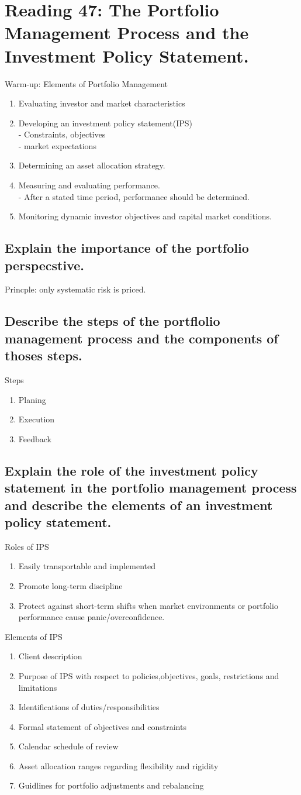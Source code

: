 \documentclass{article}
\newcommand{\be}{\begin{enumerate}}
\newcommand{\ee}{\end{enumerate}}
\begin{document}
\section{Reading 47: The Portfolio Management Process and the Investment Policy Statement.}
Warm-up: Elements of Portfolio Management
\be
    \item Evaluating investor and market characteristics
    \item Developing an investment policy statement(IPS)
        \\ - Constraints, objectives
        \\ - market expectations
    \item Determining an asset allocation strategy.
    \item Measuring and evaluating performance.
        \\ - After a stated time period, performance should be determined.
    \item Monitoring dynamic investor objectives and capital market conditions.
\ee
\subsection{Explain the importance of the portfolio perspecstive.}
Princple: only systematic risk is priced.
\subsection{Describe the steps of the portflolio management process and the components
of thoses steps.}
Steps
\be
    \item Planing
    \item Execution
    \item Feedback
\ee
\subsection{Explain the role of the investment policy statement in the portfolio
management process and describe the elements of an investment policy statement.}
Roles of IPS
\be
    \item Easily transportable and implemented
    \item Promote long-term discipline
    \item Protect against short-term shifts when market environments or portfolio performance
    cause panic/overconfidence.
\ee 
Elements of IPS
\be
    \item Client description
    \item Purpose of IPS with respect to policies,objectives, goals, restrictions and limitations
    \item Identifications of duties/responsibilities
    \item Formal statement of objectives and constraints
    \item Calendar schedule of review
    \item Asset allocation ranges regarding flexibility and rigidity
    \item Guidlines for portfolio adjustments and rebalancing
\ee
\end{document}

